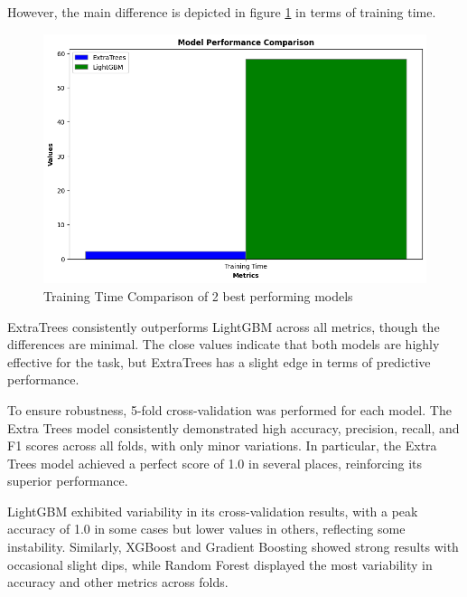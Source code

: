 \documentclass[runningheads]{llncs}
\begin{document}
However, the main difference is depicted in figure \ref{fig:top2comptime} in terms of training time.

\begin{figure}[ht]
\centerline{\includegraphics[width=\linewidth]{images/top2comptime.png}}
\caption{Training Time Comparison of 2 best performing models}
\label{fig:top2comptime}
\end{figure}

ExtraTrees consistently outperforms LightGBM across all metrics, though the differences are minimal. The close values indicate that both models are highly effective for the task, but ExtraTrees has a slight edge in terms of predictive performance.

To ensure robustness, 5-fold cross-validation was performed for each model. %
The Extra Trees model consistently demonstrated high accuracy, precision, recall, and F1 scores across all folds, with only minor variations. In particular, the Extra Trees model achieved a perfect score of 1.0 in several places, reinforcing its superior performance.

LightGBM exhibited variability in its cross-validation results, with a peak accuracy of 1.0 in some cases but lower values in others, reflecting some instability. Similarly, XGBoost and Gradient Boosting showed strong results with occasional slight dips, while Random Forest displayed the most variability in accuracy and other metrics across folds.
\end{document}
